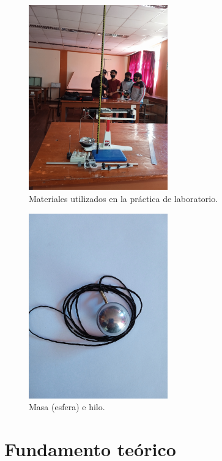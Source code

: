 \begin{multicols}{2}
	\begin{figure}[H]
		\centering
		\includegraphics[width=6cm]{Images/materials.jpeg}
		\caption{Materiales utilizados en la práctica de laboratorio.}\label{fig:01}
	\end{figure}

	\begin{figure}[H]
		\centering
		\includegraphics[width=6cm]{Images/masa_hilo.jpeg}
		\caption{Masa (esfera) e hilo.}\label{fig:02}
	\end{figure}
\end{multicols}

\section{Fundamento teórico}
